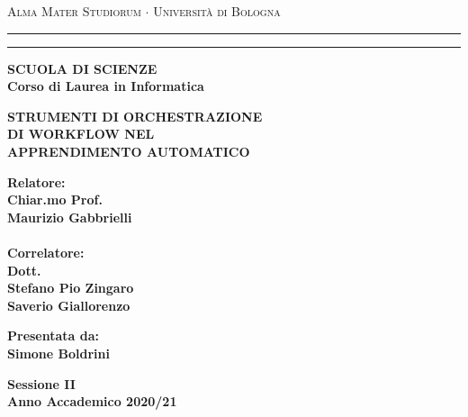 \documentclass[../tesi.tex]{subfiles}
\begin{document}
\begin{titlepage}
\begin{center}
{{\Large{\textsc{Alma Mater Studiorum $\cdot$ Universit\`a di
Bologna}}}} \rule[0.1cm]{15.8cm}{0.1mm}
\rule[0.5cm]{15.8cm}{0.6mm}
{\small{\bf SCUOLA DI SCIENZE\\
Corso di Laurea in Informatica }}
\end{center}
\vspace{15mm}
\begin{center}
{\LARGE{\bf STRUMENTI DI ORCHESTRAZIONE}}\\
\vspace{3mm}
{\LARGE{\bf DI WORKFLOW NEL }}\\
\vspace{3mm}
{\LARGE{\bf APPRENDIMENTO AUTOMATICO}}\\
\end{center}
\vspace{40mm}
\par
\noindent
\begin{minipage}[t]{0.47\textwidth}
{\large{\bf Relatore:\\
Chiar.mo Prof.\\
Maurizio Gabbrielli}}\\
\\{\large{\bf Correlatore:\\
Dott.\\Stefano Pio Zingaro\\Saverio Giallorenzo}}
\end{minipage}
\hfill
\begin{minipage}[t]{0.47\textwidth}\raggedleft
{\large{\bf Presentata da:\\ Simone Boldrini}}
\end{minipage}
\vspace{20mm}
\begin{center}
{\large{\bf Sessione II\\
Anno Accademico 2020/21}}
\end{center}
\end{titlepage}
\end{document}
